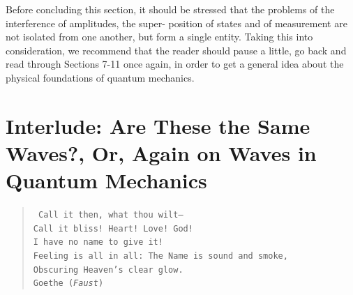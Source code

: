 \documentclass[a4paper,sfsidenotes,colorlinks=true]{tufte-book}
\numberwithin{equation}{section}
\numberwithin{figure}{section}
\begin{document}
Before concluding this section, it should be stressed that the
problems of the interference of amplitudes, the super- position of
states and of measurement are not isolated from one another, but form
a single entity. Taking this into consideration, we recommend that the
reader should pause a little, go back and read through Sections 7-11
once again, in order to get a general idea about the physical
foundations of quantum mechanics.  

\clearpage


\section*{Interlude: Are These the Same Waves?, Or, Again on Waves in Quantum Mechanics}
\label{interlude-04}

\vspace*{10pt}
\begin{fullwidth}
\begin{verse}
\texttt{\small
Call it then, what thou wilt--\\
 Call it bliss! Heart! Love! God! \\
I have no name to give it! \\
Feeling is all in all:
The Name is sound and smoke, \\
Obscuring Heaven's clear glow.\\[5pt]
Goethe (\emph{Faust})}
\end{verse}
\end{fullwidth}
\end{document}
